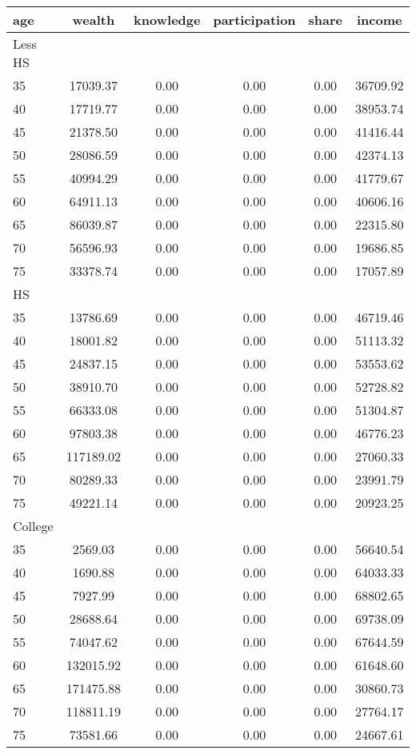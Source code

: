 \begin{tabular}{lccccc}
 \hline \hline
  age & wealth & knowledge & participation & share & income \\
 \hline
 Less HS & & & & & \\
 \hline
35 &  17039.37 &      0.00 &      0.00 &      0.00 &  36709.92 \\ 
40 &  17719.77 &      0.00 &      0.00 &      0.00 &  38953.74 \\ 
45 &  21378.50 &      0.00 &      0.00 &      0.00 &  41416.44 \\ 
50 &  28086.59 &      0.00 &      0.00 &      0.00 &  42374.13 \\ 
55 &  40994.29 &      0.00 &      0.00 &      0.00 &  41779.67 \\ 
60 &  64911.13 &      0.00 &      0.00 &      0.00 &  40606.16 \\ 
65 &  86039.87 &      0.00 &      0.00 &      0.00 &  22315.80 \\ 
70 &  56596.93 &      0.00 &      0.00 &      0.00 &  19686.85 \\ 
75 &  33378.74 &      0.00 &      0.00 &      0.00 &  17057.89 \\ 
 \hline
 HS & & & & & \\
 \hline
35 &  13786.69 &      0.00 &      0.00 &      0.00 &  46719.46 \\ 
40 &  18001.82 &      0.00 &      0.00 &      0.00 &  51113.32 \\ 
45 &  24837.15 &      0.00 &      0.00 &      0.00 &  53553.62 \\ 
50 &  38910.70 &      0.00 &      0.00 &      0.00 &  52728.82 \\ 
55 &  66333.08 &      0.00 &      0.00 &      0.00 &  51304.87 \\ 
60 &  97803.38 &      0.00 &      0.00 &      0.00 &  46776.23 \\ 
65 & 117189.02 &      0.00 &      0.00 &      0.00 &  27060.33 \\ 
70 &  80289.33 &      0.00 &      0.00 &      0.00 &  23991.79 \\ 
75 &  49221.14 &      0.00 &      0.00 &      0.00 &  20923.25 \\ 
 \hline
 College & & & & & \\
 \hline
35 &   2569.03 &      0.00 &      0.00 &      0.00 &  56640.54 \\ 
40 &   1690.88 &      0.00 &      0.00 &      0.00 &  64033.33 \\ 
45 &   7927.99 &      0.00 &      0.00 &      0.00 &  68802.65 \\ 
50 &  28688.64 &      0.00 &      0.00 &      0.00 &  69738.09 \\ 
55 &  74047.62 &      0.00 &      0.00 &      0.00 &  67644.59 \\ 
60 & 132015.92 &      0.00 &      0.00 &      0.00 &  61648.60 \\ 
65 & 171475.88 &      0.00 &      0.00 &      0.00 &  30860.73 \\ 
70 & 118811.19 &      0.00 &      0.00 &      0.00 &  27764.17 \\ 
75 &  73581.66 &      0.00 &      0.00 &      0.00 &  24667.61 \\ 
 \hline \hline
 \end{tabular}
